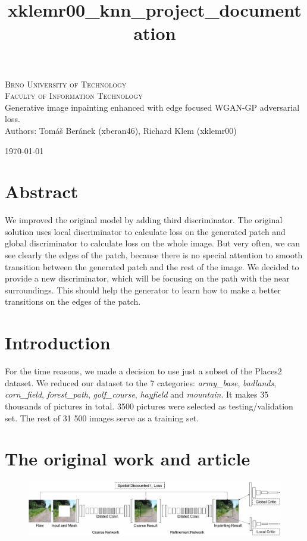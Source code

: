 \documentclass[a4paper, 11pt]{article}
\title{xklemr00\_knn\_project\_documentation}
\begin{document}
    \begin{titlepage}
 \begin{center}
  {\Huge\textsc{Brno University of Technology\\[0.3em]
    \huge{Faculty of Information Technology}}}\\
  {\Huge
  Generative image inpainting enhanced with edge focused WGAN-GP adversarial loss.}\\
  {\Large Authors: Tomáš Beránek (xberan46), Richard Klem (xklemr00)}
 \end{center}
 {\Large 
 \today 
 \hfill
}
\end{titlepage}

\newpage
\section{Abstract}
\label{section:abstract}
We improved the original model by adding third discriminator. The original solution uses local discriminator to calculate loss on the generated patch and global discriminator to calculate loss on the whole image. But very often, we can see clearly the edges of the patch, because there is no special attention to smooth transition between the generated patch and the rest of the image. We decided to provide a new discriminator, which will be focusing on the path with the near surroundings. This should help the generator to learn how to make a better transitions on the edges of the patch.

\section{Introduction}
\label{section:introduction}
For the time reasons, we made a decision to use just a subset of the Places2 dataset. We reduced our dataset to the 7 categories: \textit{army\_base}, \textit{badlands}, \textit{corn\_field},
\textit{forest\_path}, \textit{golf\_course}, \textit{hayfield} and \textit{mountain}. It makes 35 thousands of pictures in total. 3500 pictures were selected as testing/validation set.
The rest of 31 500 images serve as a training set.


\section{The original work and article}
\label{section:origin}
    \begin{figure}
        \centering
        \includegraphics[width=0.95\linewidth]{documentation/img/original_arch.png}
    \end{figure}
\end{document}
